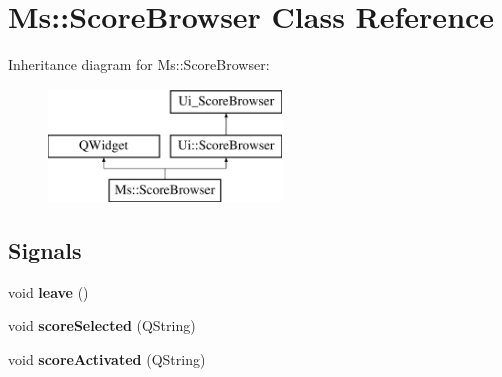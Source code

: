 \hypertarget{class_ms_1_1_score_browser}{}\section{Ms\+:\+:Score\+Browser Class Reference}
\label{class_ms_1_1_score_browser}
Inheritance diagram for Ms\+:\+:Score\+Browser\+:\begin{figure}[H]
\begin{center}
\leavevmode
\includegraphics[height=3.000000cm]{class_ms_1_1_score_browser}
\end{center}
\end{figure}
\subsection*{Signals}
\begin{DoxyCompactItemize}
\item 
\mbox{\label{class_ms_1_1_score_browser_a69200d64d5ff41a4ee8c20be3df8e9e7}} 
void {\bfseries leave} ()
\item 
\mbox{\label{class_ms_1_1_score_browser_a4c03ee615e75b5d896cdc7d7fd1f73dc}} 
void {\bfseries score\+Selected} (Q\+String)
\item 
\mbox{\label{class_ms_1_1_score_browser_a57092d25f32f39d149ddd3461cf3dfdc}} 
void {\bfseries score\+Activated} (Q\+String)
\end{DoxyCompactItemize}
